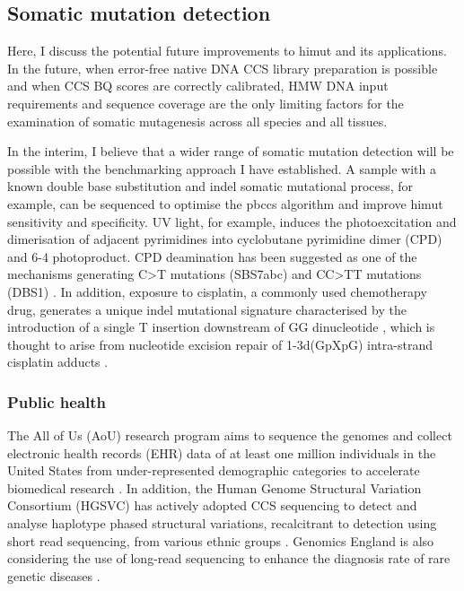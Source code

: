 \subsection{Somatic mutation detection}
 
Here, I discuss the potential future improvements to himut and its applications. In the future, when error-free native DNA CCS library preparation is possible and when CCS BQ scores are correctly calibrated, HMW DNA input requirements and sequence coverage are the only limiting factors for the examination of somatic mutagenesis across all species and all tissues. 
 
In the interim, I believe that a wider range of somatic mutation detection will be possible with the benchmarking approach I have established. A sample with a known double base substitution and indel somatic mutational process, for example, can be sequenced to optimise the pbccs algorithm and improve himut sensitivity and specificity. UV light, for example, induces the photoexcitation and dimerisation of adjacent pyrimidines into cyclobutane pyrimidine dimer (CPD) and 6-4 photoproduct. CPD deamination has been suggested as one of the mechanisms generating C>T mutations (SBS7abc) and CC>TT mutations (DBS1) \cite{}. In addition, exposure to cisplatin, a commonly used chemotherapy drug, generates a unique indel mutational signature characterised by the introduction of a single T insertion downstream of GG dinucleotide \cite{}, which is thought to arise from nucleotide excision repair of 1-3d(GpXpG) intra-strand cisplatin adducts \cite{}. 

\subsubsection{Public health}
 
The All of Us (AoU) research program aims to sequence the genomes and collect electronic health records (EHR) data of at least one million individuals in the United States from under-represented demographic categories to accelerate biomedical research \cite{}. In addition, the Human Genome Structural Variation Consortium (HGSVC) has actively adopted CCS sequencing to detect and analyse haplotype phased structural variations, recalcitrant to detection using short read sequencing, from various ethnic groups \cite{}. Genomics England is also considering the use of long-read sequencing to enhance the diagnosis rate of rare genetic diseases \cite{}. 
 
